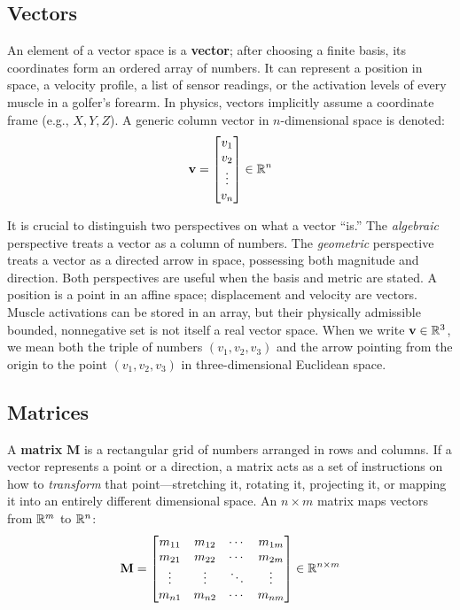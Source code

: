 \subsection{Vectors}

An element of a vector space is a \textbf{vector}; after choosing a finite basis, its coordinates form an ordered array of numbers. It can represent a position in space, a velocity profile, a list of sensor readings, or the activation levels of every muscle in a golfer's forearm. In physics, vectors implicitly assume a coordinate frame (e.g., $X, Y, Z$). A generic column vector in $n$-dimensional space is denoted:
\begin{equation}
   \mathbf{v} = \begin{bmatrix} v_1 \\ v_2 \\ \vdots \\ v_n \end{bmatrix} \in \mathbb{R}^n
\end{equation}

It is crucial to distinguish two perspectives on what a vector ``is.'' The \emph{algebraic} perspective treats a vector as a column of numbers. The \emph{geometric} perspective treats a vector as a directed arrow in space, possessing both magnitude and direction. Both perspectives are useful when the basis and metric are stated. A position is a point in an affine space; displacement and velocity are vectors. Muscle activations can be stored in an array, but their physically admissible bounded, nonnegative set is not itself a real vector space. When we write $\mathbf{v} \in \mathbb{R}^3$, we mean both the triple of numbers $(v_1, v_2, v_3)$ and the arrow pointing from the origin to the point $(v_1, v_2, v_3)$ in three-dimensional Euclidean space.

\subsection{Matrices}

A \textbf{matrix} $\mathbf{M}$ is a rectangular grid of numbers arranged in rows and columns. If a vector represents a point or a direction, a matrix acts as a set of instructions on how to \emph{transform} that point---stretching it, rotating it, projecting it, or mapping it into an entirely different dimensional space. An $n \times m$ matrix maps vectors from $\mathbb{R}^m$ to $\mathbb{R}^n$:
\begin{equation}
   \mathbf{M} = \begin{bmatrix} m_{11} & m_{12} & \cdots & m_{1m} \\ m_{21} & m_{22} & \cdots & m_{2m} \\ \vdots & \vdots & \ddots & \vdots \\ m_{n1} & m_{n2} & \cdots & m_{nm} \end{bmatrix} \in \mathbb{R}^{n \times m}
\end{equation}

